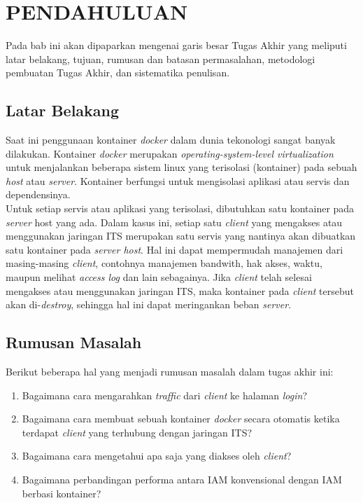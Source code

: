 \chapter{PENDAHULUAN}
  Pada bab ini akan dipaparkan mengenai garis besar Tugas Akhir yang meliputi latar belakang, tujuan, rumusan dan batasan permasalahan, metodologi pembuatan Tugas Akhir, dan sistematika penulisan.
  
  \section{Latar Belakang}
    Saat ini penggunaan kontainer \textit{docker} dalam dunia tekonologi sangat banyak dilakukan. Kontainer \textit{docker} merupakan \textit{operating-system-level virtualization} untuk menjalankan beberapa sistem linux yang terisolasi (kontainer) pada sebuah \textit{host} atau \textit{server}. Kontainer berfungsi untuk mengisolasi aplikasi atau servis dan dependensinya.\\
	\indent Untuk setiap servis atau aplikasi yang terisolasi, dibutuhkan satu kontainer pada \textit{server} host yang ada. Dalam kasus ini, setiap satu \textit{client} yang mengakses atau menggunakan jaringan ITS merupakan satu servis yang nantinya akan dibuatkan satu kontainer pada \textit{server host}. Hal ini dapat mempermudah manajemen dari masing-masing \textit{client}, contohnya manajemen bandwith, hak akses, waktu, maupun melihat \textit{access log} dan lain sebagainya. Jika \textit{client} telah selesai mengakses atau menggunakan jaringan ITS, maka kontainer pada \textit{client} tersebut akan di-\textit{destroy}, sehingga hal ini dapat meringankan beban \textit{server}.

\section{Rumusan Masalah}
	Berikut beberapa hal yang menjadi rumusan masalah dalam tugas akhir ini:
	\begin{enumerate}
	 \item Bagaimana cara mengarahkan \textit{traffic} dari \textit{client} ke halaman \textit{login}?
	 \item Bagaimana cara membuat sebuah kontainer \textit{docker} secara otomatis ketika terdapat \textit{client} yang terhubung dengan jaringan ITS?
	 \item Bagaimana cara mengetahui apa saja yang diakses oleh \textit{client}?
	 \item Bagaimana perbandingan performa antara IAM konvensional dengan IAM berbasi kontainer?
	\end{enumerate}

